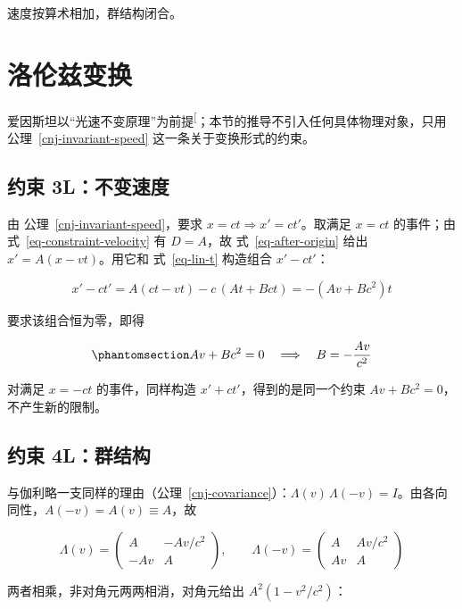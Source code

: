 \documentclass[
  chinese,
  a4paper,
  UTF8,
  12pt,
  oneside,
  openany]{ctexbook}
\theoremstyle{plain}
\theoremstyle{plain}
\theoremstyle{plain}
\theoremstyle{definition}
\theoremstyle{plain}
\theoremstyle{plain}
\theoremstyle{remark}
\begin{document}
速度按算术相加，群结构闭合。

\section{洛伦兹变换}\label{ux6d1bux4f26ux5179ux53d8ux6362}

爱因斯坦以``光速不变原理''为前提\textsuperscript{{[}\citeproc{ref-einstein1905}{1}{]}}；本节的推导不引入任何具体物理对象，只用
公理~\ref{cnj-invariant-speed} 这一条关于变换形式的约束。

\subsection{约束
3L：不变速度}\label{ux7ea6ux675f-3lux4e0dux53d8ux901fux5ea6}

由 公理~\ref{cnj-invariant-speed}，要求
\(x = ct \Rightarrow x' = ct'\)。取满足 \(x = ct\) 的事件；由
式~\ref{eq-constraint-velocity} 有 \(D = A\)，故
式~\ref{eq-after-origin} 给出 \(x' = A(x - vt)\)。用它和
式~\ref{eq-lin-t} 构造组合 \(x' - ct'\)：

\[
x' - c t'
= A(ct - vt) - c\,(At + Bct)
= -\left(Av + Bc^{2}\right)t
\]

要求该组合恒为零，即得

\begin{equation}\protect\phantomsection\label{eq-constraint-light}{
Av + Bc^{2} = 0
\quad \Longrightarrow \quad
B = -\frac{Av}{c^{2}}
}\end{equation}

对满足 \(x = -ct\) 的事件，同样构造 \(x' + ct'\)，得到的是同一个约束
\(Av + Bc^{2} = 0\)，不产生新的限制。

\subsection{约束 4L：群结构}\label{ux7ea6ux675f-4lux7fa4ux7ed3ux6784}

与伽利略一支同样的理由（公理~\ref{cnj-covariance}）：\(\Lambda(v)\,\Lambda(-v) = I\)。由各向同性，\(A(-v) = A(v) \equiv A\)，故

\[
\Lambda(v) = \begin{pmatrix} A & -Av/c^{2} \\ -Av & A \end{pmatrix},
\qquad
\Lambda(-v) = \begin{pmatrix} A & Av/c^{2} \\ Av & A \end{pmatrix}
\]

两者相乘，非对角元两两相消，对角元给出
\(A^{2}\left(1 - v^{2}/c^{2}\right)\)：
\end{document}

